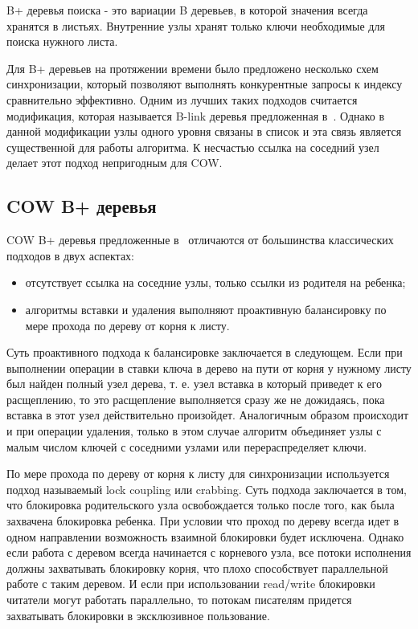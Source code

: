 B+ деревья поиска - это вариации B деревьев, в которой значения всегда хранятся
в листьях. Внутренние узлы хранят только ключи необходимые для поиска нужного
листа.

Для B+ деревьев на протяжении времени было предложено несколько схем
синхронизации, который позволяют выполнять конкурентные запросы к индексу
сравнительно эффективно. Одним из лучших таких подходов считается модификация,
которая называется B-link деревья предложенная в~\cite{BLink}. Однако в данной
модификации узлы одного уровня связаны в список и эта связь является
существенной для работы алгоритма. К несчастью ссылка на соседний узел делает
этот подход непригодным для COW.

\subsection{COW B+ деревья}

COW B+ деревья предложенные в~\cite{BCOW} отличаются от большинства классических
подходов в двух аспектах:
\begin{itemize}
   \item отсутствует ссылка на соседние узлы, только ссылки из родителя на
         ребенка;
   \item алгоритмы вставки и удаления выполняют проактивную балансировку по
         мере прохода по дереву от корня к листу.
\end{itemize}

Суть проактивного подхода к балансировке заключается в следующем. Если при
выполнении операции в ставки ключа в дерево на пути от корня у нужному листу
был найден полный узел дерева, т. е. узел вставка в который приведет к его
расщеплению, то это расщепление выполняется сразу же не дожидаясь, пока вставка
в этот узел действительно произойдет. Аналогичным образом происходит и при
операции удаления, только в этом случае алгоритм объединяет узлы с малым числом
ключей с соседними узлами или перераспределяет ключи.

По мере прохода по дереву от корня к листу для синхронизации используется подход
называемый lock coupling или crabbing. Суть подхода заключается в том, что
блокировка родительского узла освобождается только после того, как была
захвачена блокировка ребенка. При условии что проход по дереву всегда идет в
одном направлении возможность взаимной блокировки будет исключена. Однако если
работа с деревом всегда начинается с корневого узла, все потоки исполнения
должны захватывать блокировку корня, что плохо способствует параллельной работе
с таким деревом. И если при использовании read/write блокировки читатели могут
работать параллельно, то потокам писателям придется захватывать блокировки в
эксклюзивное пользование.
